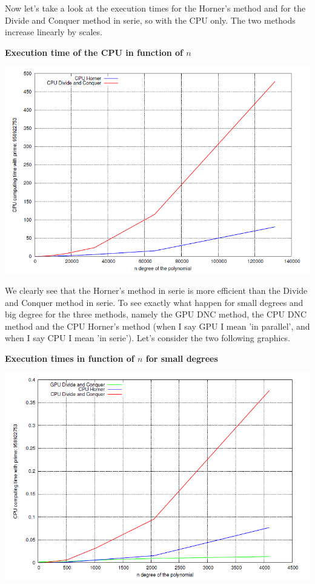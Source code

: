 Now let's take a look at the execution times for the Horner's method and for the Divide and Conquer method in serie, so with the CPU only. The two methods increase linearly by scales.\\

\begin{center}
\textbf{Execution time of the CPU in function of $n$}\\
\end{center}

\begin{center}
\includegraphics[scale=0.8]{eps/CPUtime_n.png}
\end{center}

We clearly see that the Horner's method in serie is more efficient than the Divide and Conquer method in serie. To see exactly what happen for small degrees and big degree for the three methods, namely the GPU DNC method, the CPU DNC method and the CPU Horner's method (when I say GPU I mean 'in parallel', and when I say CPU I mean 'in serie'). Let's consider the two following graphics.\\


\begin{center}
\textbf{Execution times in function of $n$ for small degrees}\\
\end{center}

\begin{center}
\includegraphics[scale=0.8]{eps/time_small_n.png}
\end{center}

